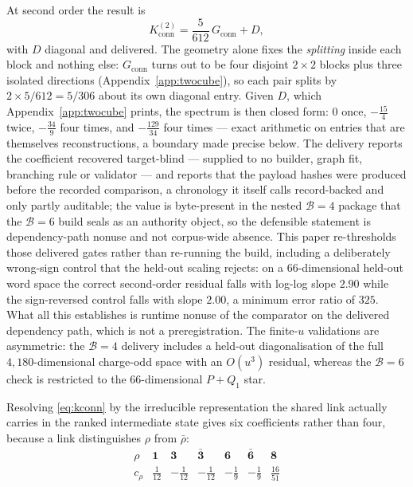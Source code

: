 \documentclass[11pt]{article}
\theoremstyle{plain}
\theoremstyle{definition}
\theoremstyle{remark}
\newcommand{\chk}[1]{}
\begin{document}
At second order the result is
\begin{equation}\label{eq:kconn}
  K^{(2)}_{\mathrm{conn}}=\frac{5}{612}\,G_{\mathrm{conn}}+D ,
\end{equation}
with $D$ diagonal and delivered. The geometry alone fixes the \emph{splitting}
inside each block and nothing else: $G_{\mathrm{conn}}$ turns out to be four
disjoint $2\times2$ blocks plus three isolated directions
(Appendix~\ref{app:twocube}), so each pair splits by $2\times5/612=5/306$ about
its own diagonal entry. Given $D$, which Appendix~\ref{app:twocube} prints,
  the spectrum is then closed form: $0$ once, $-\tfrac{15}4$ twice,
  $-\tfrac{34}9$ four times, and $-\tfrac{129}{34}$ four times ---
exact arithmetic on entries that are themselves reconstructions, a boundary
made precise below.
The delivery reports the coefficient recovered target-blind --- supplied to no
builder, graph fit, branching rule or validator --- and reports that the payload
hashes were produced before the recorded comparison, a chronology it itself
calls record-backed and only partly auditable; the value is byte-present in the
nested $\mathcal B=4$ package that the $\mathcal B=6$ build seals as an authority object, so the
defensible statement is dependency-path nonuse and not corpus-wide absence.
This paper re-thresholds those delivered gates rather
than re-running the build, including a deliberately wrong-sign control that the
held-out scaling rejects: on a $66$-dimensional held-out word space the correct
second-order residual falls with log-log slope $2.90$ while the sign-reversed
control falls with slope $2.00$, a minimum error ratio of $325$. What all this
establishes is runtime nonuse of the comparator on the delivered dependency
path, which is not a preregistration. The finite-$u$ validations are
asymmetric: the $\mathcal B=4$ delivery includes a held-out diagonalisation of
the full $4{,}180$-dimensional charge-odd space with an $O(u^3)$ residual,
whereas the $\mathcal B=6$ check is restricted to the $66$-dimensional
$P+Q_1$ star.
\chk{the connected two-cube geometry has exactly four cross-cell pairs, each -1}
\chk{the B=6 connected kernel is (5/612) G\_conn + diag, with the certified spectrum}
\chk{the certificate's own gates pass, target-blind, with the wrong-sign control rejected}

Resolving \eqref{eq:kconn} by the irreducible representation the shared link
actually carries in the ranked intermediate state gives six coefficients rather
than four, because a link distinguishes $\rho$ from $\bar\rho$:
\begin{equation}\label{eq:census}
\begin{array}{c|cccccc}
 \rho & \mathbf1 & \mathbf3 & \bar{\mathbf3} & \mathbf6 & \bar{\mathbf6} & \mathbf8\\
 \hline
 c_\rho & \tfrac1{12} & -\tfrac1{12} & -\tfrac1{12}
        & -\tfrac19 & -\tfrac19 & \tfrac{16}{51}
\end{array}
\end{equation}
\chk{the B=6 six-channel census sums to the registry's own t\_3 = 5/612}
\end{document}
